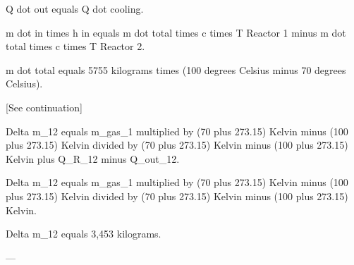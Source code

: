 Q dot out equals Q dot cooling.  

m dot in times h in equals m dot total times c times T Reactor 1 minus m dot total times c times T Reactor 2.  

m dot total equals 5755 kilograms times (100 degrees Celsius minus 70 degrees Celsius).  

[See continuation]

Delta m_12 equals m_gas_1 multiplied by (70 plus 273.15) Kelvin minus (100 plus 273.15) Kelvin divided by (70 plus 273.15) Kelvin minus (100 plus 273.15) Kelvin plus Q_R_12 minus Q_out_12.  

Delta m_12 equals m_gas_1 multiplied by (70 plus 273.15) Kelvin minus (100 plus 273.15) Kelvin divided by (70 plus 273.15) Kelvin minus (100 plus 273.15) Kelvin.  

Delta m_12 equals 3,453 kilograms.  

---